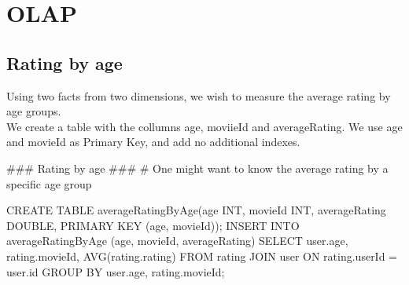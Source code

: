\section{OLAP}
\subsection{Rating by age}
Using two facts from two dimensions, we wish to measure the average rating by
age groups.\\
We create a table with the collumns age, moviieId and averageRating. We use age
and movieId as Primary Key, and add no additional indexes.\\
\begin{spverbatim}
### Rating by age ###
# One might want to know the average rating by a specific age group

CREATE TABLE averageRatingByAge(age INT, movieId INT, averageRating DOUBLE,
PRIMARY KEY (age, movieId));
INSERT INTO averageRatingByAge (age, movieId, averageRating) SELECT user.age,
rating.movieId, AVG(rating.rating) FROM rating JOIN user ON rating.userId =
user.id GROUP BY user.age, rating.movieId;
\end{spverbatim}
\newpage
